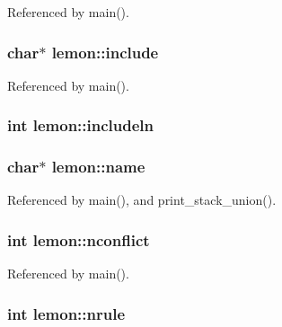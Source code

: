 Referenced by main().

\hypertarget{structlemon_a28f30e75b7f399aa335adc47a32f46cb}{
\subsubsection[{include}]{\setlength{\rightskip}{0pt plus 5cm}char$\ast$ lemon\-::include}}\label{structlemon_a28f30e75b7f399aa335adc47a32f46cb}


Referenced by main().

\hypertarget{structlemon_ac04c5942002ee2221e33a432823c8e21}{
\subsubsection[{includeln}]{\setlength{\rightskip}{0pt plus 5cm}int lemon\-::includeln}}\label{structlemon_ac04c5942002ee2221e33a432823c8e21}
\hypertarget{structlemon_a278763cc1efb250e51a339e6ece76779}{
\subsubsection[{name}]{\setlength{\rightskip}{0pt plus 5cm}char$\ast$ lemon\-::name}}\label{structlemon_a278763cc1efb250e51a339e6ece76779}


Referenced by main(), and print\-\_\-stack\-\_\-union().

\hypertarget{structlemon_a32cffc536c6549297e55b847d6ace646}{
\subsubsection[{nconflict}]{\setlength{\rightskip}{0pt plus 5cm}int lemon\-::nconflict}}\label{structlemon_a32cffc536c6549297e55b847d6ace646}


Referenced by main().

\hypertarget{structlemon_ab2eb64aec57c0ec728204ccbac59ef1c}{
\subsubsection[{nrule}]{\setlength{\rightskip}{0pt plus 5cm}int lemon\-::nrule}}\label{structlemon_ab2eb64aec57c0ec728204ccbac59ef1c}


